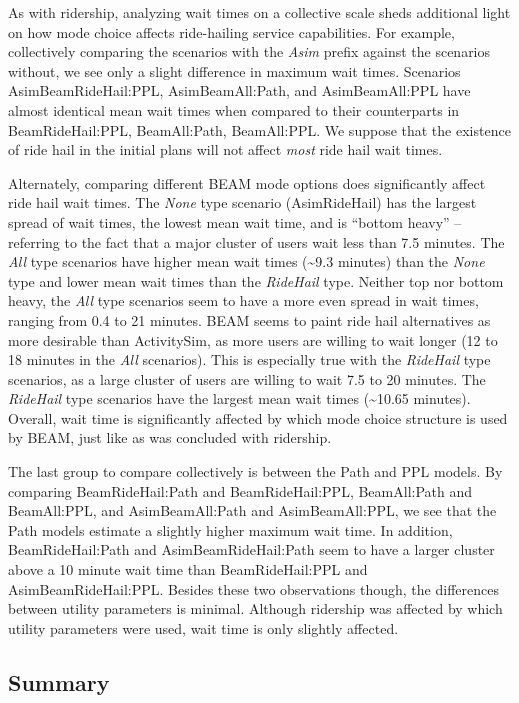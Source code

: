 \documentclass[fancy, masters]{byuthesis}
\begin{document}
As with ridership, analyzing wait times on a collective scale sheds additional light on how mode choice affects ride-hailing service capabilities. For example, collectively comparing the scenarios with the \emph{Asim} prefix against the scenarios without, we see only a slight difference in maximum wait times. Scenarios AsimBeamRideHail:PPL, AsimBeamAll:Path, and AsimBeamAll:PPL have almost identical mean wait times when compared to their counterparts in BeamRideHail:PPL, BeamAll:Path, BeamAll:PPL. We suppose that the existence of ride hail in the initial plans will not affect \emph{most} ride hail wait times.

Alternately, comparing different BEAM mode options does significantly affect ride hail wait times. The \emph{None} type scenario (AsimRideHail) has the largest spread of wait times, the lowest mean wait time, and is ``bottom heavy'' -- referring to the fact that a major cluster of users wait less than 7.5 minutes. The \emph{All} type scenarios have higher mean wait times (\textasciitilde9.3 minutes) than the \emph{None} type and lower mean wait times than the \emph{RideHail} type. Neither top nor bottom heavy, the \emph{All} type scenarios seem to have a more even spread in wait times, ranging from 0.4 to 21 minutes. BEAM seems to paint ride hail alternatives as more desirable than ActivitySim, as more users are willing to wait longer (12 to 18 minutes in the \emph{All} scenarios). This is especially true with the \emph{RideHail} type scenarios, as a large cluster of users are willing to wait 7.5 to 20 minutes. The \emph{RideHail} type scenarios have the largest mean wait times (\textasciitilde10.65 minutes). Overall, wait time is significantly affected by which mode choice structure is used by BEAM, just like as was concluded with ridership.

The last group to compare collectively is between the Path and PPL models. By comparing BeamRideHail:Path and BeamRideHail:PPL, BeamAll:Path and BeamAll:PPL, and AsimBeamAll:Path and AsimBeamAll:PPL, we see that the Path models estimate a slightly higher maximum wait time. In addition, BeamRideHail:Path and AsimBeamRideHail:Path seem to have a larger cluster above a 10 minute wait time than BeamRideHail:PPL and AsimBeamRideHail:PPL. Besides these two observations though, the differences between utility parameters is minimal. Although ridership was affected by which utility parameters were used, wait time is only slightly affected.

\hypertarget{summary}{%
\subsection{Summary}\label{summary}}
\end{document}
